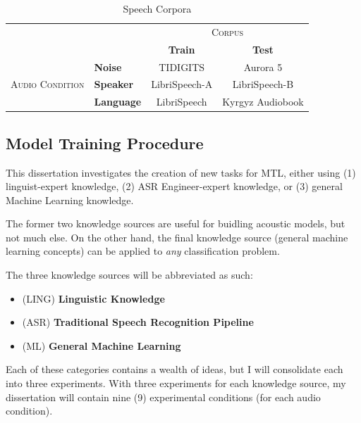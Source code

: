 \documentclass[10pt,a4paper]{article}
\begin{document}
\begin{table}[!htbp]
  \centering
  \begin{adjustbox}{width=.75\textwidth}
    \begin{tabular}{clcc}
      \toprule
      && \multicolumn{2}{c}{\textsc{Corpus}}\\
      && \textbf{Train} & \textbf{Test}\\
      \midrule
      \multirow{3}{*}{\textsc{Audio Condition}} &\textbf{Noise} & TIDIGITS & Aurora 5 \\
      &\textbf{Speaker} & LibriSpeech-A & LibriSpeech-B \\
      &\textbf{Language} & LibriSpeech & Kyrgyz Audiobook \\
      \bottomrule
    \end{tabular}
    \label{table:data}
  \end{adjustbox}
  
  \caption{Speech Corpora}
  
\end{table}


\subsection{Model Training Procedure}

This dissertation investigates the creation of new tasks for MTL, either using (1) linguist-expert knowledge, (2) ASR Engineer-expert knowledge, or (3) general Machine Learning knowledge.

The former two knowledge sources are useful for buidling acoustic models, but not much else. On the other hand, the final knowledge source (general machine learning concepts) can be applied to \textit{any} classification problem.

The three knowledge sources will be abbreviated as such:
  
\begin{itemize}
\item  (\textsc{LING}) \textbf{Linguistic Knowledge} 
\item (\textsc{ASR}) \textbf{Traditional Speech Recognition Pipeline}
\item (\textsc{ML}) \textbf{General Machine Learning}
\end{itemize}


Each of these categories contains a wealth of ideas, but I will consolidate each into three experiments. With three experiments for each knowledge source, my dissertation will contain nine (9) experimental conditions (for each audio condition).
\end{document}
